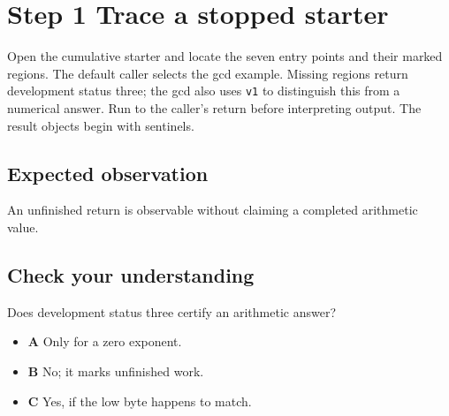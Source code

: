 \section{Step 1 Trace a stopped starter}\label{rsa-s01}

Open the cumulative starter and locate the seven entry points and their marked regions. The default caller selects the gcd example. Missing regions return development status three; the gcd also uses \texttt{v1} to distinguish this from a numerical answer. Run to the caller's return before interpreting output. The result objects begin with sentinels.

\subsection{Expected observation}
An unfinished return is observable without claiming a completed arithmetic value.

\subsection{Check your understanding}
Does development status three certify an arithmetic answer?

\begin{itemize}
  \item \textbf{A} Only for a zero exponent.
  \item \textbf{B} No; it marks unfinished work.
  \item \textbf{C} Yes, if the low byte happens to match.
\end{itemize}
